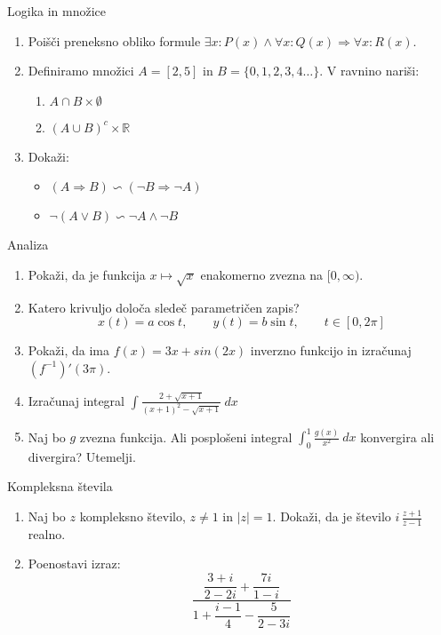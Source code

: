 \begin{frame}{Logika in množice}
	\begin{enumerate}
		\item
		Poišči preneksno obliko formule \( \exists x : P(x) \wedge \forall x : Q(x) \Rightarrow \forall x : R(x)\).
		\item 
		Definiramo množici \(A = [2,5]\) in \(B = \{0,1,2,3,4 \dots\} \).
		V ravnino nariši:
		\begin{enumerate}
		   \item \( A \cap B \times \emptyset \)
		   \item \((A \cup B)^c \times \mathbb{R} \)
		\end{enumerate}
		\item
		Dokaži:
		\begin{itemize}
			\item \((A \Rightarrow B) \backsim (\neg B \Rightarrow \neg A)\)
			\item \(\neg(A \vee B) \backsim \neg A \wedge \neg B\)
		\end{itemize}
	\end{enumerate}
\end{frame}

\begin{frame}{Analiza}
	\begin{enumerate}
		\item
		Pokaži, da je funkcija \( x \mapsto \sqrt{x}\) enakomerno zvezna na \([0, \infty)\).
		\item 
		Katero krivuljo določa sledeč parametričen zapis?
		$$
		   x(t) = a \cos t, \qquad %
		   y(t) = b \sin t, \qquad %
		   t \in [0, 2 \pi]
		$$ 
		\item
		Pokaži, da ima $f(x) = 3x + sin(2x)$ inverzno funkcijo in izračunaj $(f^{-1})'(3 \pi)$.
		
		\item
		Izračunaj integral 
		$
		\displaystyle
		\int \frac{2+\sqrt{x+1}}{(x+1)^2-\sqrt{x+1}} \ dx
		$
		\item 
		Naj bo $g$ zvezna funkcija. Ali posplošeni integral 
		$\int_{0}^{1} \frac{g(x)}{x^2} \ dx$
		konvergira ali divergira? Utemelji.
	\end{enumerate}
\end{frame}

\begin{frame}{Kompleksna števila}
	\begin{enumerate}
		\item
		Naj bo $z$ kompleksno število, $z \ne 1$ in \(|z| = 1\).
		Dokaži, da je število \( i \, \frac{z+1}{z-1} \) realno.
		\item
		Poenostavi izraz:
		\[
		\frac{\dfrac{3+i}{2-2i} + \dfrac{7i}{1-i}}{1 + \dfrac{i-1}{4} - \dfrac{5}{2-3i}}
		\]
	\end{enumerate}
\end{frame}